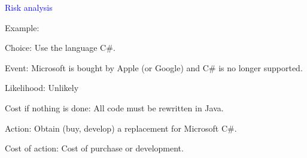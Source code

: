 \documentclass{slides}
\newcommand{\ti}[1]{\begin{center}\Large{\textcolor{blue}{#1}}\end{center}}
\begin{document}
\begin{slide}\ti{Risk analysis}

Example:

Choice: Use the language C\#.

Event: Microsoft is bought by Apple (or Google) and C\# is no longer
supported.

Likelihood: Unlikely

Cost if nothing is done: All code must be rewritten in Java.

Action: Obtain (buy, develop) a replacement for Microsoft C\#.

Cost of action: Cost of purchase or development.

\vfill\end{slide}


\end{document}
